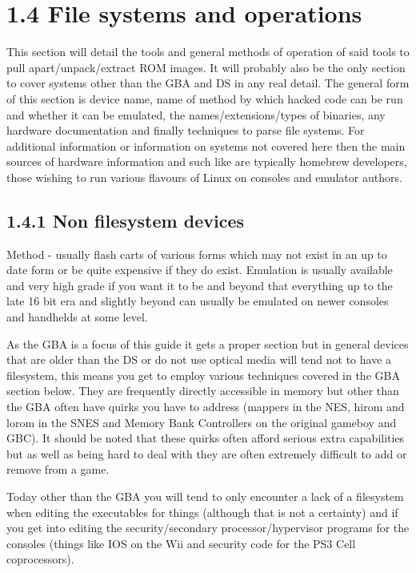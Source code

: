 \documentclass[
]{book}
\begin{document}
\hypertarget{file-systems-and-operations}{%
\section{1.4 File systems and operations}\label{file-systems-and-operations}}

This section will detail the tools and general methods of operation of said tools to pull apart/unpack/extract ROM images. It will probably also be the only section to cover systems other than the GBA and DS in any real detail. The general form of this section is device name, name of method by which hacked code can be run and whether it can be emulated, the names/extensions/types of binaries, any hardware documentation and finally techniques to parse file systems. For additional information or information on systems not covered here then the main sources of hardware information and such like are typically homebrew developers, those wishing to run various flavours of Linux on consoles and emulator authors.

\hypertarget{non-filesystem-devices}{%
\subsection{1.4.1 Non filesystem devices}\label{non-filesystem-devices}}

Method - usually flash carts of various forms which may not exist in an up to date form or be quite expensive if they do exist. Emulation is usually available and very high grade if you want it to be and beyond that everything up to the late 16 bit era and slightly beyond can usually be emulated on newer consoles and handhelds at some level.

As the GBA is a focus of this guide it gets a proper section but in general devices that are older than the DS or do not use optical media will tend not to have a filesystem, this means you get to employ various techniques covered in the GBA section below. They are frequently directly accessible in memory but other than the GBA often have quirks you have to address (mappers in the NES, hirom and lorom in the SNES and Memory Bank Controllers on the original gameboy and GBC). It should be noted that these quirks often afford serious extra capabilities but as well as being hard to deal with they are often extremely difficult to add or remove from a game.

Today other than the GBA you will tend to only encounter a lack of a filesystem when editing the executables for things (although that is not a certainty) and if you get into editing the security/secondary processor/hypervisor programs for the consoles (things like IOS on the Wii and security code for the PS3 Cell coprocessors).
\end{document}
